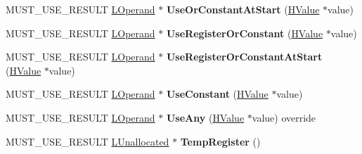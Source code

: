 \begin{DoxyCompactItemize}
\item 
M\+U\+S\+T\+\_\+\+U\+S\+E\+\_\+\+R\+E\+S\+U\+LT \hyperlink{classv8_1_1internal_1_1_l_operand}{L\+Operand} $\ast$ {\bfseries Use\+Or\+Constant\+At\+Start} (\hyperlink{classv8_1_1internal_1_1_h_value}{H\+Value} $\ast$value)\hypertarget{classv8_1_1internal_1_1_l_chunk_builder_a5338ef34c47b58207b22fd5a66807f85}{}\label{classv8_1_1internal_1_1_l_chunk_builder_a5338ef34c47b58207b22fd5a66807f85}

\item 
M\+U\+S\+T\+\_\+\+U\+S\+E\+\_\+\+R\+E\+S\+U\+LT \hyperlink{classv8_1_1internal_1_1_l_operand}{L\+Operand} $\ast$ {\bfseries Use\+Register\+Or\+Constant} (\hyperlink{classv8_1_1internal_1_1_h_value}{H\+Value} $\ast$value)\hypertarget{classv8_1_1internal_1_1_l_chunk_builder_aace121601a2caa8e6684cc5d5963f0df}{}\label{classv8_1_1internal_1_1_l_chunk_builder_aace121601a2caa8e6684cc5d5963f0df}

\item 
M\+U\+S\+T\+\_\+\+U\+S\+E\+\_\+\+R\+E\+S\+U\+LT \hyperlink{classv8_1_1internal_1_1_l_operand}{L\+Operand} $\ast$ {\bfseries Use\+Register\+Or\+Constant\+At\+Start} (\hyperlink{classv8_1_1internal_1_1_h_value}{H\+Value} $\ast$value)\hypertarget{classv8_1_1internal_1_1_l_chunk_builder_a14ca10ac408e3ec8501d2875ddf606fc}{}\label{classv8_1_1internal_1_1_l_chunk_builder_a14ca10ac408e3ec8501d2875ddf606fc}

\item 
M\+U\+S\+T\+\_\+\+U\+S\+E\+\_\+\+R\+E\+S\+U\+LT \hyperlink{classv8_1_1internal_1_1_l_operand}{L\+Operand} $\ast$ {\bfseries Use\+Constant} (\hyperlink{classv8_1_1internal_1_1_h_value}{H\+Value} $\ast$value)\hypertarget{classv8_1_1internal_1_1_l_chunk_builder_a6985436610071c802b9a670ae3f60700}{}\label{classv8_1_1internal_1_1_l_chunk_builder_a6985436610071c802b9a670ae3f60700}

\item 
M\+U\+S\+T\+\_\+\+U\+S\+E\+\_\+\+R\+E\+S\+U\+LT \hyperlink{classv8_1_1internal_1_1_l_operand}{L\+Operand} $\ast$ {\bfseries Use\+Any} (\hyperlink{classv8_1_1internal_1_1_h_value}{H\+Value} $\ast$value) override\hypertarget{classv8_1_1internal_1_1_l_chunk_builder_a61cb5c69ba1d82ff575d5d84ff6d1721}{}\label{classv8_1_1internal_1_1_l_chunk_builder_a61cb5c69ba1d82ff575d5d84ff6d1721}

\item 
M\+U\+S\+T\+\_\+\+U\+S\+E\+\_\+\+R\+E\+S\+U\+LT \hyperlink{classv8_1_1internal_1_1_l_unallocated}{L\+Unallocated} $\ast$ {\bfseries Temp\+Register} ()\hypertarget{classv8_1_1internal_1_1_l_chunk_builder_a4ba4ae71849e93fc59cb527dce3dbeea}{}\label{classv8_1_1internal_1_1_l_chunk_builder_a4ba4ae71849e93fc59cb527dce3dbeea}


\end{DoxyCompactItemize}
